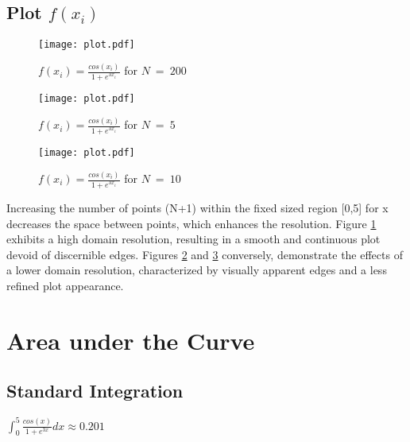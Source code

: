 \documentclass[12pt]{article}
\begin{document}
		\subsection{Plot $f(x_{i})$}
			
			
			\begin{figure}[H]
				\centering
				\texttt{[image: plot.pdf]}
				\caption{\Large $f(x_{i}) = \frac{cos(x_{i})}{1 + e^{3x_{i}}}$ for $N \ = \ 200$}
				\label{fig:fx200}
			\end{figure}
			
			\begin{figure}[H]
				\centering
				\texttt{[image: plot.pdf]}
				\caption{\Large $f(x_{i}) = \frac{cos(x_{i})}{1 + e^{3x_{i}}}$ for $N \ = \ 5$}
				\label{fig:fx5}
			\end{figure}
			
			\begin{figure}[H]
				\centering
				\texttt{[image: plot.pdf]}
				\caption{\Large $f(x_{i}) = \frac{cos(x_{i})}{1 + e^{3x_{i}}}$ for $N \ = \ 10$}
				\label{fig:fx10}
			\end{figure}
			  Increasing the number of points (N+1) within the fixed sized region [0,5] for x decreases
			  the space between points, which enhances the resolution. Figure \ref{fig:fx200} exhibits a high domain resolution, resulting in a smooth and continuous plot devoid of discernible edges. Figures \ref{fig:fx5} and \ref{fig:fx10} conversely, demonstrate the effects of a lower domain resolution, characterized by visually apparent edges and a less refined plot appearance. 
			
	\section {Area under the Curve}
		\subsection{Standard Integration}
			
			\begin{center}
				\LARGE $\int_{0}^{5} \frac{cos(x)}{1 + e^{3x}} dx \approx 0.201$
			\end{center}
			
\end{document}
